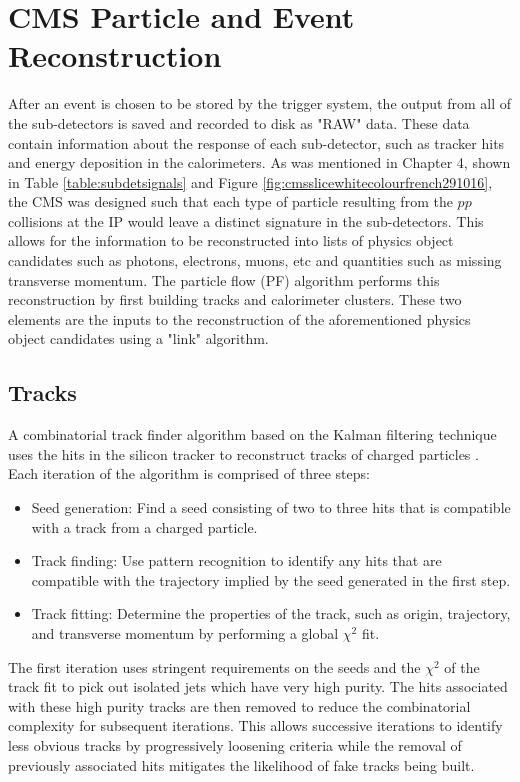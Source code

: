 \chapter{CMS Particle and Event Reconstruction}

After an event is chosen to be stored by the trigger system, the output from all of the sub-detectors is saved and recorded to disk as "RAW" data.  These data contain information about the response of each sub-detector, such as tracker hits and energy deposition in the calorimeters.  As was mentioned in Chapter 4, shown in Table \ref{table:subdetsignals} and Figure \ref{fig:cmsslicewhitecolourfrench291016}, the CMS was designed such that each type of particle resulting from the $pp$ collisions at the IP would leave a distinct signature in the sub-detectors.  This allows for the information to be reconstructed into lists of physics object candidates such as photons, electrons, muons, etc and quantities such as missing transverse momentum.  The particle flow (PF) algorithm performs this reconstruction by first building tracks and calorimeter clusters.  These two elements are the inputs to the reconstruction of the aforementioned physics object candidates using a "link" algorithm.

\section{Tracks}
A combinatorial track finder algorithm based on the Kalman filtering technique uses the hits in the silicon tracker to reconstruct tracks of charged particles \cite{Kalmantracking:1987fm}.  Each iteration of the algorithm is comprised of three steps:
\begin{itemize}
	\item Seed generation:  Find a seed consisting of two to three hits that is compatible with a track from a charged particle.
	\item Track finding: Use pattern recognition to identify any hits that are compatible with the trajectory implied by the seed generated in the first step.
	\item Track fitting: Determine the properties of the track, such as origin, trajectory, and transverse momentum by performing a global $\chi^2$ fit.
\end{itemize}

The first iteration uses stringent requirements on the seeds and the $\chi^2$ of the track fit to pick out isolated jets which have very high purity.  The hits associated with these high purity tracks are then removed to reduce the combinatorial complexity for subsequent iterations.  This allows successive iterations to identify less obvious tracks by progressively loosening criteria while the removal of previously associated hits mitigates the likelihood of fake tracks being built.  


